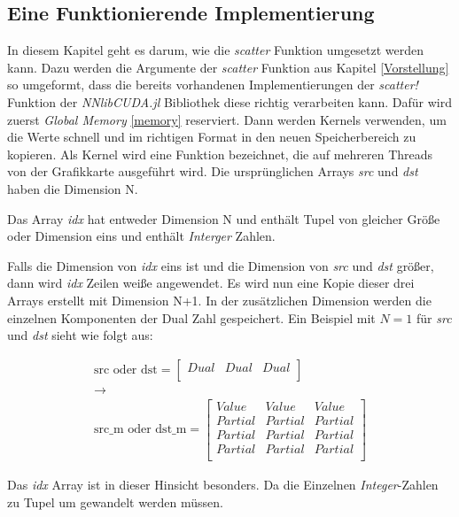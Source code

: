 \subsection{Eine Funktionierende Implementierung}

In diesem Kapitel geht es darum, wie die \textit{scatter} Funktion umgesetzt werden kann.
Dazu werden die Argumente der \textit{scatter} Funktion aus Kapitel \ref{Vorstellung} so
umgeformt, 
dass die bereits vorhandenen Implementierungen der \textit{scatter!} Funktion der \textit{NNlibCUDA.jl} Bibliothek 
diese richtig verarbeiten kann.
Dafür wird zuerst \textit{Global Memory} \ref{memory} reserviert. Dann werden Kernels verwenden, 
um die Werte schnell und im richtigen Format in den neuen Speicherbereich zu kopieren.
Als Kernel wird eine Funktion bezeichnet, die auf mehreren Threads von der Grafikkarte ausgeführt wird.
Die ursprünglichen Arrays \textit{src} und \textit{dst} haben die Dimension N.

Das Array \textit{idx} hat entweder Dimension N und enthält Tupel von gleicher Größe
oder Dimension eins und enthält \textit{Interger} Zahlen.

Falls die Dimension von \textit{idx} eins ist und die Dimension von \textit{src}
und \textit{dst} größer, dann wird \textit{idx} Zeilen weiße angewendet.
Es wird nun eine Kopie dieser drei Arrays erstellt mit Dimension N+1.
In der zusätzlichen Dimension werden die einzelnen Komponenten der Dual Zahl gespeichert.
Ein Beispiel mit $N = 1$ für \textit{src} und \textit{dst} sieht wie folgt aus:


\begin{gather}
\text{src oder dst} = 
\begin{bmatrix}
Dual & Dual & Dual\\
\end{bmatrix}\\
\rightarrow\\
\text{src\_m oder dst\_m} = 
\begin{bmatrix}
Value   & Value   & Value   \\
Partial & Partial & Partial \\
Partial & Partial & Partial \\
Partial & Partial & Partial \\
\end{bmatrix}
\end{gather}


Das \textit{idx} Array ist in dieser Hinsicht besonders.
Da die Einzelnen \textit{Integer}-Zahlen zu Tupel um gewandelt werden müssen.


